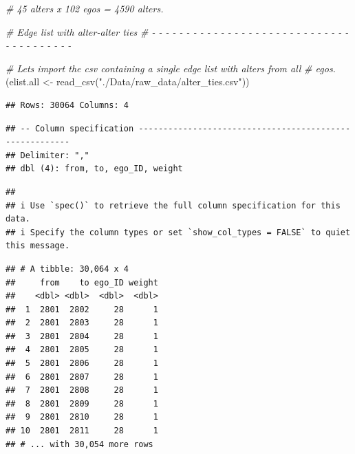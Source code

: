 \documentclass[
]{book}
\newenvironment{Shaded}{\begin{snugshade}}{\end{snugshade}}
\newcommand{\AttributeTok}[1]{\textcolor[rgb]{0.77,0.63,0.00}{#1}}
\newcommand{\CommentTok}[1]{\textcolor[rgb]{0.56,0.35,0.01}{\textit{#1}}}
\newcommand{\FunctionTok}[1]{\textcolor[rgb]{0.00,0.00,0.00}{#1}}
\newcommand{\NormalTok}[1]{#1}
\newcommand{\OtherTok}[1]{\textcolor[rgb]{0.56,0.35,0.01}{#1}}
\newcommand{\SpecialCharTok}[1]{\textcolor[rgb]{0.00,0.00,0.00}{#1}}
\newcommand{\StringTok}[1]{\textcolor[rgb]{0.31,0.60,0.02}{#1}}
\begin{document}
\begin{Shaded}
\begin{Highlighting}[]
\CommentTok{\# 45 alters x 102 egos = 4590 alters.}

\CommentTok{\# Edge list with alter{-}alter ties}
\CommentTok{\# {-} {-} {-} {-} {-} {-} {-} {-} {-} {-} {-} {-} {-} {-} {-} {-} {-} {-} {-} {-} {-} {-} {-} {-} {-} {-} {-} {-} {-} {-} {-} {-} {-} {-} {-} {-} {-} {-} {-} }

\CommentTok{\# Let\textquotesingle{}s import the csv containing a single edge list with alters from all}
\CommentTok{\# egos.}
\NormalTok{(elist.all }\OtherTok{\textless{}{-}} \FunctionTok{read\_csv}\NormalTok{(}\StringTok{"./Data/raw\_data/alter\_ties.csv"}\NormalTok{))}
\end{Highlighting}
\end{Shaded}

\begin{verbatim}
## Rows: 30064 Columns: 4
\end{verbatim}

\begin{verbatim}
## -- Column specification --------------------------------------------------------
## Delimiter: ","
## dbl (4): from, to, ego_ID, weight
\end{verbatim}

\begin{verbatim}
## 
## i Use `spec()` to retrieve the full column specification for this data.
## i Specify the column types or set `show_col_types = FALSE` to quiet this message.
\end{verbatim}

\begin{verbatim}
## # A tibble: 30,064 x 4
##     from    to ego_ID weight
##    <dbl> <dbl>  <dbl>  <dbl>
##  1  2801  2802     28      1
##  2  2801  2803     28      1
##  3  2801  2804     28      1
##  4  2801  2805     28      1
##  5  2801  2806     28      1
##  6  2801  2807     28      1
##  7  2801  2808     28      1
##  8  2801  2809     28      1
##  9  2801  2810     28      1
## 10  2801  2811     28      1
## # ... with 30,054 more rows
\end{verbatim}

\begin{Shaded}
\end{Shaded}
\end{document}
